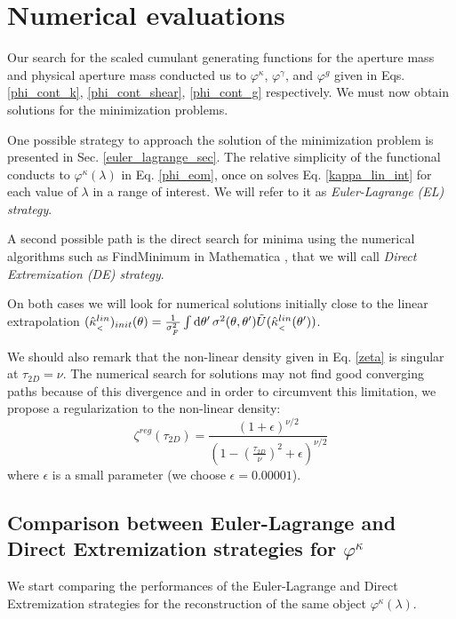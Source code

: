 \documentclass[twocolumn,aps,reprint, nofootinbib]{revtex4}
\newcommand{\dd}{{\rm d}}
\newcommand{\hkappa}{\hat{\kappa}_{_<}}
\newcommand{\tU}{\tilde{U}}
\newcommand{\varphik}{\varphi^{\kappa}}
\newcommand{\varphig}{\varphi^{\gamma}}
\newcommand{\varphir}{\varphi^{g}}
\begin{document}
\section{Numerical evaluations}
\label{Numericals}
Our search for the scaled cumulant generating functions for the aperture mass and physical aperture mass conducted us to $\varphik$, $\varphig$, and $\varphir$ given in Eqs. \eqref{phi_cont_k}, \eqref{phi_cont_shear}, \eqref{phi_cont_g} respectively. We must now obtain solutions for the minimization problems.

One possible strategy to approach the solution of the minimization problem is presented in Sec. \ref{euler_lagrange_sec}. The relative simplicity of the functional conducts to $\varphik(\lambda)$ in Eq. \eqref{phi_eom}, once on solves Eq. \eqref{kappa_lin_int} for each value of $\lambda$ in a range of interest. We will refer to it as \emph{Euler-Lagrange (EL) strategy}.

A second possible path is the direct search for minima using the numerical algorithms such as FindMinimum in Mathematica \cite{math}, that we will call \emph{Direct Extremization (DE) strategy}. 

On both cases we will look for numerical solutions initially close to the linear extrapolation 
$(\hkappa^{lin})_{init} (\theta)  =   \frac{1}{\sigma_{_F}^2} \int \dd \theta' \, \sigma^2(\theta, \theta')  \tU(\hkappa^{lin} (\theta'))$.

We should also remark that the non-linear density given in Eq. \eqref{zeta} is singular at $\tau_{2D} = \nu$. The numerical search for solutions may not find good converging paths because of this divergence and in order to circumvent this limitation, we propose a regularization to the non-linear density:
\begin{equation}
\label{zeta_reg}
\zeta^{reg}(\tau_{2D}) = \frac{(1 + \epsilon)^{\nu/2}}{\left(1 - \left(\frac{\tau_{2D}}{\nu} \right)^2 + \epsilon \right)^{\nu/2}}
\end{equation}
where $\epsilon$ is a small parameter (we choose $\epsilon=0.00001$). 

\subsection{Comparison between Euler-Lagrange and Direct Extremization strategies for $\varphik$}
\label{comparison}
We start comparing the performances of the Euler-Lagrange and Direct Extremization strategies for the reconstruction of the same object $\varphik(\lambda)$. 
\end{document}
